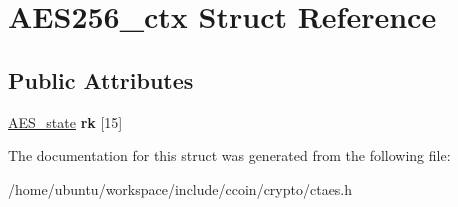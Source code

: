 \hypertarget{structAES256__ctx}{\section{A\-E\-S256\-\_\-ctx Struct Reference}
\label{structAES256__ctx}
}
\subsection*{Public Attributes}
\begin{DoxyCompactItemize}
\item 
\hypertarget{structAES256__ctx_aaaa11f6acdfd8ca0281d22389431e9de}{\hyperlink{structAES__state}{A\-E\-S\-\_\-state} {\bfseries rk} \mbox{[}15\mbox{]}}\label{structAES256__ctx_aaaa11f6acdfd8ca0281d22389431e9de}

\end{DoxyCompactItemize}


The documentation for this struct was generated from the following file\-:\begin{DoxyCompactItemize}
\item 
/home/ubuntu/workspace/include/ccoin/crypto/ctaes.\-h\end{DoxyCompactItemize}
